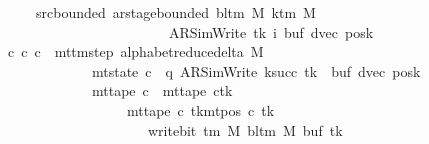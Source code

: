 \begin{isabellebody}
\ \ \ \ \ \ \ src{\isacharunderscore}{\kern0pt}bounded{\isacharcolon}{\kern0pt}\ {\isachardoublequoteopen}ar{\isacharunderscore}{\kern0pt}stage{\isacharunderscore}{\kern0pt}bounded\ {\isacharparenleft}{\kern0pt}bl{\isacharunderscore}{\kern0pt}tm\ M{\isacharparenright}{\kern0pt}\ {\isacharparenleft}{\kern0pt}k{\isacharunderscore}{\kern0pt}tm\ M{\isacharparenright}{\kern0pt}\isanewline
\ \ \ \ \ \ \ \ \ \ \ \ \ \ \ \ \ \ \ \ \ \ \ \ \ \ {\isacharparenleft}{\kern0pt}AR{\isacharunderscore}{\kern0pt}SimWrite{\isacharcomma}{\kern0pt}\ tk{\isacharcomma}{\kern0pt}\ i{\isacharcomma}{\kern0pt}\ buf{\isacharcomma}{\kern0pt}\ dvec{\isacharcomma}{\kern0pt}\ posk{\isacharparenright}{\kern0pt}{\isachardoublequoteclose}\isanewline
\ \ \ {\isachardoublequoteopen}{\isasymexists}c{\isacharprime}{\kern0pt}{\isacharprime}{\kern0pt}{\isachardot}{\kern0pt}\ {\isacharparenleft}{\kern0pt}c{\isacharprime}{\kern0pt}{\isacharcomma}{\kern0pt}\ c{\isacharprime}{\kern0pt}{\isacharprime}{\kern0pt}{\isacharparenright}{\kern0pt}\ {\isasymin}\ mttm{\isacharunderscore}{\kern0pt}step\ {\isacharparenleft}{\kern0pt}alphabet{\isacharunderscore}{\kern0pt}reduce{\isacharunderscore}{\kern0pt}delta\ M{\isacharparenright}{\kern0pt}\isanewline
\ \ \ \ \ \ \ \ \ \ \ \ \ \ {\isasymand}\ mt{\isacharunderscore}{\kern0pt}state\ c{\isacharprime}{\kern0pt}{\isacharprime}{\kern0pt}\ {\isacharequal}{\kern0pt}\ {\isacharparenleft}{\kern0pt}q{\isacharcomma}{\kern0pt}\ AR{\isacharunderscore}{\kern0pt}SimWrite{\isacharcomma}{\kern0pt}\ k{\isacharunderscore}{\kern0pt}succ\ tk{\isacharcomma}{\kern0pt}\ {}{\isacharcomma}{\kern0pt}\ buf{\isacharcomma}{\kern0pt}\ dvec{\isacharcomma}{\kern0pt}\ posk{\isacharparenright}{\kern0pt}\isanewline
\ \ \ \ \ \ \ \ \ \ \ \ \ \ {\isasymand}\ mt{\isacharunderscore}{\kern0pt}tape\ c{\isacharprime}{\kern0pt}{\isacharprime}{\kern0pt}\ {\isacharequal}{\kern0pt}\ {\isacharparenleft}{\kern0pt}mt{\isacharunderscore}{\kern0pt}tape\ c{\isacharprime}{\kern0pt}{\isacharparenright}{\kern0pt}{\isacharparenleft}{\kern0pt}tk\ {\isacharcolon}{\kern0pt}{\isacharequal}{\kern0pt}\isanewline
\ \ \ \ \ \ \ \ \ \ \ \ \ \ \ \ \ \ \ \ {\isacharparenleft}{\kern0pt}mt{\isacharunderscore}{\kern0pt}tape\ c{\isacharprime}{\kern0pt}\ tk{\isacharparenright}{\kern0pt}{\isacharparenleft}{\kern0pt}mt{\isacharunderscore}{\kern0pt}pos\ c{\isacharprime}{\kern0pt}\ tk\ {\isacharcolon}{\kern0pt}{\isacharequal}{\kern0pt}\isanewline
\ \ \ \ \ \ \ \ \ \ \ \ \ \ \ \ \ \ \ \ \ \ \ write{\isacharunderscore}{\kern0pt}bit\ {\isacharparenleft}{\kern0pt}{\isasymGamma}{\isacharunderscore}{\kern0pt}tm\ M{\isacharparenright}{\kern0pt}\ {\isacharparenleft}{\kern0pt}bl{\isacharunderscore}{\kern0pt}tm\ M{\isacharparenright}{\kern0pt}\ {\isacharparenleft}{\kern0pt}buf\ tk{\isacharparenright}{\kern0pt}\isanewline

\end{isabellebody}

